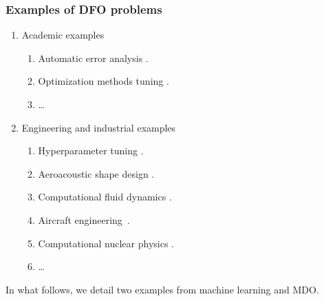 \documentclass{polyu-presentation}
\begin{document}
\begin{frame}
    \frametitle{Examples of DFO problems}

    \begin{enumerate}
        \item Academic examples
        \begin{enumerate}
            \item Automatic error analysis \parencite{Higham_1993,Higham_2002}.
            \item Optimization methods tuning \parencite{Audet_Orban_2006}.
            \item \dots
        \end{enumerate}
        \item Engineering and industrial examples
        \begin{enumerate}
            \item \alert<2>{Hyperparameter tuning} \parencite{Ghanbari_Scheinberg_2017}.
            \item Aeroacoustic shape design \parencite{Marsden_2004,Marsden_Etal_2004}.
            \item Computational fluid dynamics \parencite{Duvigneau_Visonneau_2004}.
            \item \alert<2>{Aircraft engineering}~\parencite{Gazaix_Etal_2019}.
            \item Computational nuclear physics \parencite{Eldred_Etal_2022}.
            \item \dots
        \end{enumerate}
    \end{enumerate}

    \medskip

    \pause
    \begin{block}{}
        In what follows, we detail two examples from \alert{machine learning} and \alert{MDO}.
    \end{block}
\end{frame}
\end{document}
